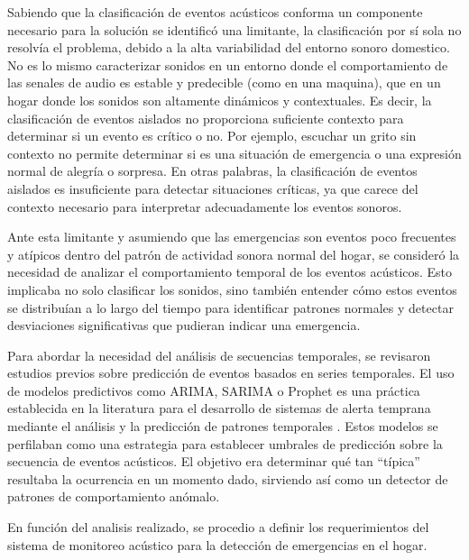 Sabiendo que la clasificación de eventos acústicos conforma un componente necesario para la solución se identificó una limitante, la clasificación por sí sola no resolvía el problema, debido a la alta variabilidad del entorno sonoro domestico. No es lo mismo caracterizar sonidos en un entorno donde el comportamiento de las senales de audio es estable y predecible (como en una maquina), que en un hogar donde los sonidos son altamente dinámicos y contextuales. Es decir, la clasificación de eventos aislados no proporciona suficiente contexto para determinar si un evento es crítico o no. Por ejemplo, escuchar un grito sin contexto no permite determinar si es una situación de emergencia o una expresión normal de alegría o sorpresa. En otras palabras, la clasificación de eventos aislados es insuficiente para detectar situaciones críticas, ya que carece del contexto necesario para interpretar adecuadamente los eventos sonoros.

Ante esta limitante y asumiendo que las emergencias son eventos poco frecuentes y atípicos dentro del patrón de actividad sonora normal del hogar, se consideró la necesidad de analizar el comportamiento temporal de los eventos acústicos. Esto implicaba no solo clasificar los sonidos, sino también entender cómo estos eventos se distribuían a lo largo del tiempo para identificar patrones normales y detectar desviaciones significativas que pudieran indicar una emergencia.

Para abordar la necesidad del análisis de secuencias temporales, se revisaron estudios previos sobre predicción de eventos basados en series temporales. El uso de modelos predictivos como ARIMA, SARIMA o Prophet es una práctica establecida en la literatura para el desarrollo de sistemas de alerta temprana mediante el análisis y la predicción de patrones temporales \citeauthor{mora2023analisis} \citeyear{mora2023analisis}. Estos modelos se perfilaban como una estrategia para establecer umbrales de predicción sobre la secuencia de eventos acústicos. El objetivo era determinar qué tan ``típica'' resultaba la ocurrencia en un momento dado, sirviendo así como un detector de patrones de comportamiento anómalo.

En función del analisis realizado, se procedio a definir los requerimientos del sistema de monitoreo acústico para la detección de emergencias en el hogar.


